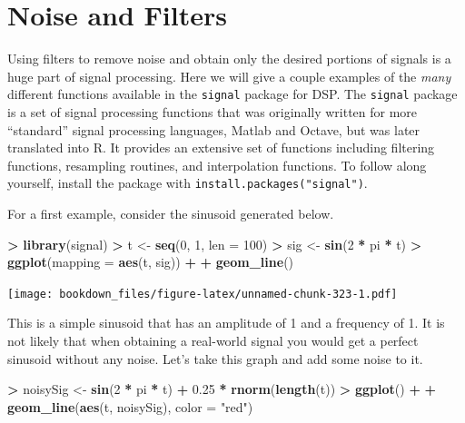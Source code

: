 \documentclass[]{krantz}
\makeatletter
\newenvironment{Shaded}{\begin{snugshade}}{\end{snugshade}}
\newcommand{\KeywordTok}[1]{\textcolor[rgb]{0.27,0.27,0.27}{\textbf{#1}}}
\newcommand{\DataTypeTok}[1]{\textcolor[rgb]{0.27,0.27,0.27}{#1}}
\newcommand{\DecValTok}[1]{\textcolor[rgb]{0.06,0.06,0.06}{#1}}
\newcommand{\FloatTok}[1]{\textcolor[rgb]{0.06,0.06,0.06}{#1}}
\newcommand{\StringTok}[1]{\textcolor[rgb]{0.5,0.5,0.5}{#1}}
\newcommand{\OperatorTok}[1]{\textcolor[rgb]{0.43,0.43,0.43}{\textbf{#1}}}
\newcommand{\NormalTok}[1]{#1}
\newenvironment{kframe}{%
\medskip{}
\setlength{\fboxsep}{.8em}
 \def\at@end@of@kframe{}%
 \ifinner\ifhmode%
  \def\at@end@of@kframe{\end{minipage}}%
  \begin{minipage}{\columnwidth}%
 \fi\fi%
 \def\FrameCommand##1{\hskip\@totalleftmargin \hskip-\fboxsep
 \colorbox{shadecolor}{##1}\hskip-\fboxsep
     \hskip-\linewidth \hskip-\@totalleftmargin \hskip\columnwidth}%
 \MakeFramed {\advance\hsize-\width
   \@totalleftmargin\z@ \linewidth\hsize
   \@setminipage}}%
 {\par\unskip\endMakeFramed%
 \at@end@of@kframe}
\renewenvironment{Shaded}{\begin{kframe}}{\end{kframe}}
\makeatother
\begin{document}
\section{Noise and Filters}\label{noise-and-filters}

Using filters to remove noise and obtain only the desired portions of
signals is a huge part of signal processing. Here we will give a couple
examples of the \emph{many} different functions available in the
\texttt{signal} package for DSP. The \texttt{signal} package is a set of
signal processing functions that was originally written for more
``standard'' signal processing languages, Matlab and Octave, but was
later translated into R. It provides an extensive set of functions
including filtering functions, resampling routines, and interpolation
functions. To follow along yourself, install the package with
\texttt{install.packages("signal")}.

For a first example, consider the sinusoid generated below.

\begin{Shaded}
\begin{Highlighting}[]
\OperatorTok{>}\StringTok{ }\KeywordTok{library}\NormalTok{(signal)}
\OperatorTok{>}\StringTok{ }\NormalTok{t <-}\StringTok{ }\KeywordTok{seq}\NormalTok{(}\DecValTok{0}\NormalTok{, }\DecValTok{1}\NormalTok{, }\DataTypeTok{len =} \DecValTok{100}\NormalTok{)}
\OperatorTok{>}\StringTok{ }\NormalTok{sig <-}\StringTok{ }\KeywordTok{sin}\NormalTok{(}\DecValTok{2} \OperatorTok{*}\StringTok{ }\NormalTok{pi }\OperatorTok{*}\StringTok{ }\NormalTok{t)}
\OperatorTok{>}\StringTok{ }\KeywordTok{ggplot}\NormalTok{(}\DataTypeTok{mapping =} \KeywordTok{aes}\NormalTok{(t, sig)) }\OperatorTok{+}\StringTok{ }
\OperatorTok{+}\StringTok{   }\KeywordTok{geom_line}\NormalTok{()}
\end{Highlighting}
\end{Shaded}

\texttt{[image: bookdown\_files/figure-latex/unnamed-chunk-323-1.pdf]}

This is a simple sinusoid that has an amplitude of 1 and a frequency of
1. It is not likely that when obtaining a real-world signal you would
get a perfect sinusoid without any noise. Let's take this graph and add
some noise to it.

\begin{Shaded}
\begin{Highlighting}[]
\OperatorTok{>}\StringTok{ }\NormalTok{noisySig <-}\StringTok{ }\KeywordTok{sin}\NormalTok{(}\DecValTok{2} \OperatorTok{*}\StringTok{ }\NormalTok{pi }\OperatorTok{*}\StringTok{ }\NormalTok{t) }\OperatorTok{+}\StringTok{ }\FloatTok{0.25} \OperatorTok{*}\StringTok{ }\KeywordTok{rnorm}\NormalTok{(}\KeywordTok{length}\NormalTok{(t))}
\OperatorTok{>}\StringTok{ }\KeywordTok{ggplot}\NormalTok{() }\OperatorTok{+}\StringTok{ }
\OperatorTok{+}\StringTok{   }\KeywordTok{geom_line}\NormalTok{(}\KeywordTok{aes}\NormalTok{(t, noisySig), }\DataTypeTok{color =} \StringTok{"red"}\NormalTok{)}
\end{Highlighting}
\end{Shaded}
\end{document}
